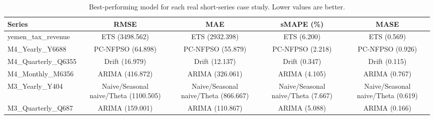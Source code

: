\begin{table}[!t]
\centering
\scriptsize
\caption{Best-performing model for each real short-series case study. Lower values are better.}
\label{tab:real_short_series_best_models}
\begin{tabular}{lcccc}
\hline
Series & RMSE & MAE & sMAPE (\%) & MASE \\
\hline
yemen\_tax\_revenue & ETS (3498.562) & ETS (2932.398) & ETS (6.200) & ETS (0.569) \\
M4\_Yearly\_Y6688 & PC-NFPSO (64.898) & PC-NFPSO (55.879) & PC-NFPSO (2.218) & PC-NFPSO (0.926) \\
M4\_Quarterly\_Q6355 & Drift (16.979) & Drift (12.137) & Drift (0.347) & Drift (0.115) \\
M4\_Monthly\_M6356 & ARIMA (416.872) & ARIMA (326.061) & ARIMA (4.105) & ARIMA (0.767) \\
M3\_Yearly\_Y404 & Naive/Seasonal naive/Theta (1100.505) & Naive/Seasonal naive/Theta (866.667) & Naive/Seasonal naive/Theta (7.667) & Naive/Seasonal naive/Theta (0.619) \\
M3\_Quarterly\_Q687 & ARIMA (159.001) & ARIMA (110.867) & ARIMA (5.088) & ARIMA (0.166) \\
\hline
\end{tabular}
\end{table}
